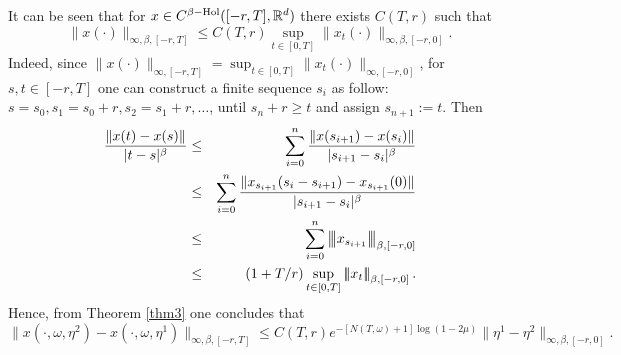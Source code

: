\documentclass[graybox]{svmult}
\newcommand{\R}{\ensuremath{\mathbb{R}}}
\newcommand{\ltn}{\ensuremath{\left| \! \left| \! \left|}}
\newcommand{\rtn}{\ensuremath{\right| \! \right| \! \right|}}
\begin{document}
\begin{remark}
	It can be seen that  for $x\in C^{\beta\rm{-Hol}}([-r,T],\R^d)$ there exists $C(T,r)$ such that
	$$\|x(\cdot)\|_{\infty,\beta,[-r,T]} \leq C(T,r)\sup_{t\in[0,T]}\|x_t(\cdot)\|_{\infty,\beta,[-r,0]}.$$
	Indeed, since $\|x(\cdot)\|_{\infty,[-r,T]} =\sup_{t\in[0,T]}\|x_t(\cdot)\|_{\infty,[-r,0]}$, for $s,t \in[-r,T]$ one can construct a finite sequence $s_i$ as follow: $s=s_0, s_1=s_0+r, s_2=s_1+r,\dots $, until $s_n+r\geq t$ and assign $s_{n+1}:=t$. Then
		\begin{eqnarray*}
			\frac{\|x(t)-x(s)\|}{|t-s|^\beta} &\leq & \sum_{i=0}^{n}\frac{\|x(s_{i+1})-x({s_i})\|}{|s_{i+1}-s_i|^\beta}\\
			&\leq &  \sum_{i=0}^{n}\frac{\|x_{s_{i+1}}(s_i-s_{i+1})-x_{s_{i+1}}(0)\|}{|s_{i+1}-s_i|^\beta}\\
			&\leq &  \sum_{i=0}^{n}\ltn x_{s_{i+1}}\rtn_{\beta,[-r,0]}\\
			&\leq & (1+T/r)\sup_{t\in[0,T]}\ltn x_{t}\rtn_{\beta,[-r,0]}.
		\end{eqnarray*}
	Hence, from Theorem \ref{thm3} one concludes that 
	\[
	\|x(\cdot,\omega,\eta^2) - x(\cdot,\omega,\eta^1)\|_{\infty,\beta,[-r,T]}\leq C(T,r)e^{-[N(T,\omega)+1]\log(1-2\mu)} \|\eta^1 - \eta^2\|_{\infty,\beta,[-r,0]}.
	\]

\end{remark}
\end{document}
